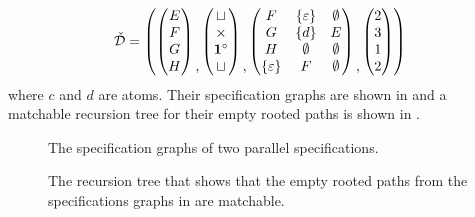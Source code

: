 \[
    \check{\mathcal{D}} = \left(
        \begin{pmatrix}
            E\\F\\G\\H
        \end{pmatrix}
        \begin{matrix}\\\\\\,\end{matrix}
        \begin{pmatrix}
            \sqcup\\\times\\\mathbf{1}^\circ\\\sqcup
        \end{pmatrix}
        \begin{matrix}\\\\\\,\end{matrix}
        \begin{pmatrix}
            F & \left\{\varepsilon\right\} & \emptyset\\
            G & \left\{d\right\} & E\\
            H & \emptyset & \emptyset\\
            \left\{\varepsilon\right\} & F & \emptyset
        \end{pmatrix}
        \begin{matrix}\\\\\\,\end{matrix}
        \begin{pmatrix}
            2\\3\\1\\2
        \end{pmatrix}
    \right)
\]
where $c$ and $d$ are atoms. Their specification graphs are shown in  and a matchable recursion tree for their empty rooted paths is shown in .
\begin{figure}[ht!]
    \centering
    
    \caption{The specification graphs of two parallel specifications.}
    \label{fig:para_spec}
\end{figure}
\begin{figure}[ht!]
    \centering
    
    \caption{The recursion tree that shows that the empty rooted paths from the specifications graphs in  are matchable.}
    \label{fig:para_spec_rec}
\end{figure}

